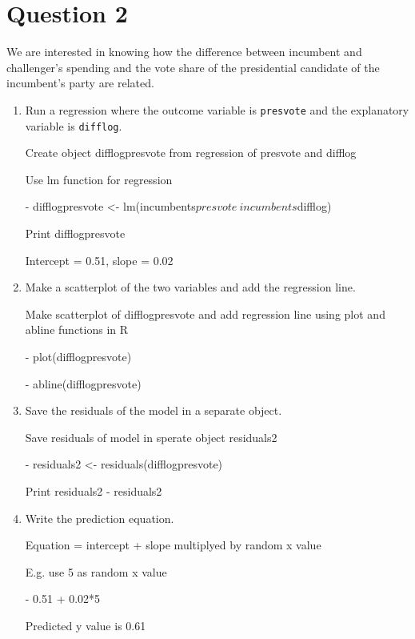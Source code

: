 \documentclass[12pt,letterpaper]{article}
\begin{document}
\section*{Question 2}%
\noindent We are interested in knowing how the difference between incumbent and challenger's spending and the vote share of the presidential candidate of the incumbent's party are related.	\vspace{.25cm}
	\begin{enumerate}
		\item Run a regression where the outcome variable is \texttt{presvote} and the explanatory variable is \texttt{difflog}.	\vspace{5cm}
		
		Create object difflogpresvote from regression of presvote and difflog
		
		Use lm function for regression
		
	-	difflogpresvote <- lm(incumbents$presvote ~ incumbents$difflog)
		
	Print difflogpresvote 
	 
	 Intercept = 0.51, slope = 0.02
	
		\item Make a scatterplot of the two variables and add the regression line. 	\vspace{5cm}
		
		Make scatterplot of difflogpresvote and add regression line using plot and abline functions in R
		
	-	plot(difflogpresvote)
	
	-	abline(difflogpresvote)
		
		\item Save the residuals of the model in a separate object.	\vspace{5cm}
		
		 Save residuals of model in sperate object residuals2
				
	- 	residuals2 <- residuals(difflogpresvote)
	
		Print residuals2
		- residuals2
		\item Write the prediction equation.
	
	Equation = intercept + slope multiplyed by random x value
	
	E.g. use 5 as random x value
	
	-	0.51 + 0.02*5
	
	Predicted y value is 0.61
	\end{enumerate}
	
	\newpage	
\end{document}
